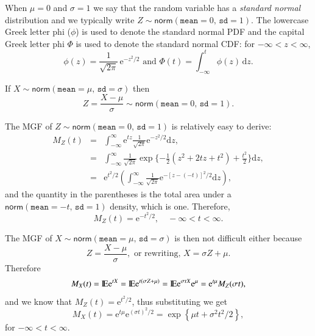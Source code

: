 \documentclass[captions=tableheading]{scrbook}
\begin{document}
When \(\mu=0\) and \(\sigma=1\) we say that the random variable has a \emph{standard normal} distribution and we typically write \(Z\sim\mathsf{norm}(\mathtt{mean}=0,\,\mathtt{sd}=1)\). The lowercase Greek letter phi (\(\phi\)) is used to denote the standard normal PDF and the capital Greek letter phi \(\Phi\) is used to denote the standard normal CDF: for \(-\infty<z<\infty\),
\begin{equation}
\phi(z)=\frac{1}{\sqrt{2\pi}}\,\mathrm{e}^{-z^{2}/2}\mbox{ and }\Phi(t)=\int_{-\infty}^{t}\phi(z)\,\mathrm{d} z.
\end{equation}

\begin{prop}
If \(X\sim\mathsf{norm}(\mathtt{mean}=\mu,\,\mathtt{sd}=\sigma)\) then
\begin{equation}
Z=\frac{X-\mu}{\sigma}\sim\mathsf{norm}(\mathtt{mean}=0,\,\mathtt{sd}=1).
\end{equation}
\end{prop}

The MGF of \(Z\sim\mathsf{norm}(\mathtt{mean}=0,\,\mathtt{sd}=1)\) is relatively easy to derive:
\begin{eqnarray*}
M_{Z}(t) & = & \int_{-\infty}^{\infty}\mathrm{e}^{tz}\frac{1}{\sqrt{2\pi}}\mathrm{e}^{-z^{2}/2}\mathrm{d} z,\\
 & = & \int_{-\infty}^{\infty}\frac{1}{\sqrt{2\pi}}\exp \{ -\frac{1}{2}\left(z^{2}+2tz+t^{2}\right)+\frac{t^{2}}{2} \} \mathrm{d} z,\\
 & = & \mathrm{e}^{t^{2}/2}\left(\int_{-\infty}^{\infty}\frac{1}{\sqrt{2\pi}}\mathrm{e}^{-[z-(-t)]^{2}/2}\mathrm{d} z\right),
\end{eqnarray*}
and the quantity in the parentheses is the total area under a \(\mathsf{norm}(\mathtt{mean}=-t,\,\mathtt{sd}=1)\) density, which is one. Therefore,
\begin{equation}
M_{Z}(t)=\mathrm{e}^{-t^{2}/2},\quad-\infty<t<\infty.
\end{equation}

\begin{example}
The MGF of \(X\sim\mathsf{norm}(\mathtt{mean}=\mu,\,\mathtt{sd}=\sigma)\) is then not difficult either because 
\[
Z=\frac{X-\mu}{\sigma},\mbox{ or rewriting, }X=\sigma Z+\mu.
\]
Therefore
\[
M_{X}(t)=\mathrm{I\hspace{-1.5pt}E}\mathrm{e}^{tX}=\mathrm{I\hspace{-1.5pt}E}\mathrm{e}^{t(\sigma Z+\mu)}=\mathrm{I\hspace{-1.5pt}E}\mathrm{e}^{\sigma tX}\mathrm{e}^{\mu}=\mathrm{e}^{t\mu}M_{Z}(\sigma t),
\]
and we know that \(M_{Z}(t)=\mathrm{e}^{t^{2}/2}\), thus substituting we get
\[
M_{X}(t)=\mathrm{e}^{t\mu}\mathrm{e}^{(\sigma t)^{2}/2}=\exp\left\{ \mu t+\sigma^{2}t^{2}/2\right\} ,
\]
for \(-\infty<t<\infty\).
\end{example}
\end{document}
